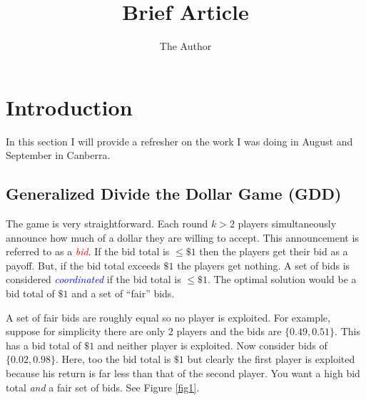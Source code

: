 \documentclass{article}   	%
\title{Brief Article}
\author{The Author}
\begin{document}

\section{Introduction}

In this section I will provide a refresher on the work I was doing in August and September in Canberra.

\subsection{Generalized Divide the Dollar Game (GDD)}
The game is very straightforward. Each round $k>2$ players simultaneously announce how much of a dollar they are willing to accept. This announcement is referred to as a \textcolor{red}{\textit{bid}}.  If the bid total is $\le\$1$ then the players get their bid as a payoff. But, if the bid total exceeds $\$1$ the players get nothing.  A set of bids is considered \textcolor{blue}{\textit{coordinated}} if the bid total is $\le \$1$. The optimal solution would be a bid total of $\$1$ and a set of ``fair'' bids. 

A set of fair bids are roughly equal so no player is exploited. For example, suppose for simplicity there are only 2 players and the bids are $\{0.49, 0.51\}$. This has a bid total of $\$1$ and neither player is exploited. Now consider bids of $\{0.02, 0.98\}$. Here, too the bid total is $\$1$ but clearly the first player is exploited because his return is far less than that of the second player. You want a high bid total \textit{and} a fair set of bids.
See Figure \ref{fig1}.
\end{document}
